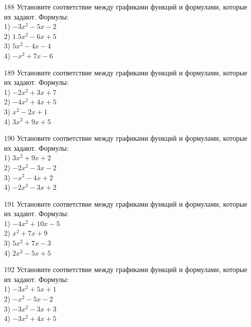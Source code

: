 \documentclass[4apaper]{article}
\begin{document}
\begin{taskBN}{188}
Установите соответствие между графиками функций и формулами, которые их задают. Формулы: \\1) $-3x^2-5x-2$\\2) $1.5x^2-6x+5$\\3) $5x^2-4x-4$\\4) $-x^2+7x-6$
\end{taskBN}

\begin{taskBN}{189}
Установите соответствие между графиками функций и формулами, которые их задают. Формулы: \\1) $-2x^2+3x+7$\\2) $-4x^2+4x+5$\\3) $x^2-2x+1$\\4) $3x^2+9x+5$
\end{taskBN}

\begin{taskBN}{190}
Установите соответствие между графиками функций и формулами, которые их задают. Формулы: \\1) $3x^2+9x+2$\\2) $-2x^2-3x-2$\\3) $-x^2-4x+2$\\4) $-2x^2-3x+2$
\end{taskBN}

\begin{taskBN}{191}
Установите соответствие между графиками функций и формулами, которые их задают. Формулы: \\1) $-4x^2+10x-5$\\2) $x^2+7x+9$\\3) $5x^2+7x-3$\\4) $2x^2-5x+5$
\end{taskBN}

\begin{taskBN}{192}
Установите соответствие между графиками функций и формулами, которые их задают. Формулы: \\1) $-3x^2+5x+1$\\2) $-x^2-5x-2$\\3) $-3x^2-3x+3$\\4) $-3x^2+4x+5$
\end{taskBN}
\end{document}

